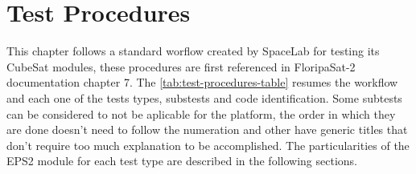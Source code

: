 %
%
%
%
%

%
%
%
%
%
%

\chapter{Test Procedures} \label{ch:test-procedures}

This chapter follows a standard worflow created by SpaceLab for testing its CubeSat modules, these procedures are first referenced in FloripaSat-2 documentation chapter 7\cite{floripasat2-doc}.
The \autoref{tab:test-procedures-table} resumes the workflow and each one of the tests types, substests and code identification. 
Some subtests can be considered to not be aplicable for the platform, the order in which they are done doesn't need to follow the numeration and other have generic titles that don't require too much explanation to be accomplished.     
The particularities of the EPS2 module for each test type are described in the following sections.

